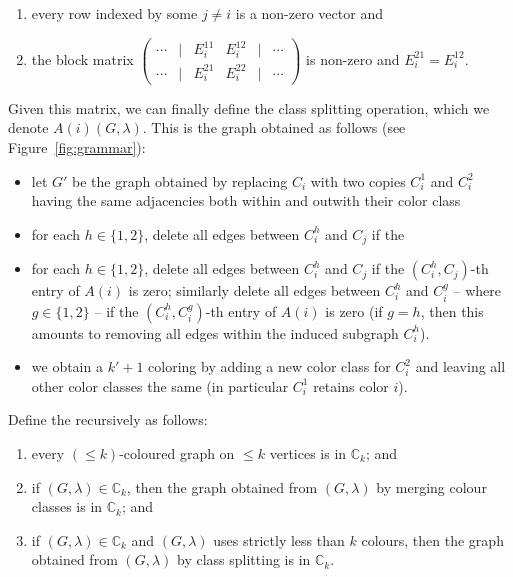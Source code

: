 \begin{enumerate}
\begin{enumerate}
        \item every row indexed by some $j \neq i$ is a non-zero vector and 
        \item the block matrix  
            \(
                \begin{pmatrix}
                    \cdots & \big| & E_{i}^{11} & E_i^{12} & \big| & \cdots \\
                    \cdots & \big| & E_i^{21} & E_i^{22} & \big| & \cdots
                \end{pmatrix}
            \) is non-zero and $E_i^{21} = E_i^{12}$. 
    \end{enumerate}
    Given this matrix, we can finally define the class splitting operation, which we denote $A(i)(G, \lambda)$. This is the graph obtained as follows (see Figure~\ref{fig:grammar}):
    \begin{itemize}
        \item let $G'$ be the graph obtained by replacing $C_i$ with two copies $C_i^1$ and $C_i^2$ having the same adjacencies both within and outwith their color class  
        \item for each $h \in \{1, 2\}$, delete all edges between $C_i^h$ and $C_j$ if the         \item for each $h \in \{1, 2\}$, delete all edges between $C_i^h$ and $C_j$ if the $(C_i^h, C_j)$-th entry of $A(i)$ is zero; similarly delete all edges between $C_i^h$ and $C_i^g$ -- where $g \in \{1, 2\}$ -- if the $(C_i^h, C_i^g)$-th entry of $A(i)$ is zero (if $g = h$, then this amounts to removing all edges within the induced subgraph $C_i^h$).
        \item we obtain a $k' + 1$ coloring by adding a new color class for $C_{i}^2$ and leaving all other color classes the same (in particular $C_{i}^1$ retains color $i$).
    \end{itemize}
    \end{enumerate}
Define the  recursively as follows:
\begin{enumerate}
    \item every $(\le k)$-coloured graph on $\le k$ vertices is in $\mathbb{C}_k$; and
    \item if $(G,\lambda)\in\mathbb{C}_k$, then the graph obtained from $(G,\lambda)$ by merging colour classes is in $\mathbb{C}_k$; and
    \item if $(G,\lambda)\in\mathbb{C}_k$ and $(G,\lambda)$ uses strictly less than $k$ colours, then the graph obtained from $(G,\lambda)$ by class splitting is in $\mathbb{C}_k$.
\end{enumerate}

